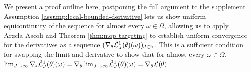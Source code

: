 \documentclass[numsec,webpdf,modern,medium,namedate]{oup-authoring-template}
\newcommand\arxiv[2]{#2} %
\theoremstyle{thmstyleone}%
\theoremstyle{thmstyletwo}%
\theoremstyle{thmstylethree}%
\begin{document}
We present a proof outline here, postponing the full argument to \arxiv{Appendix~\ref{appendix:consistency}}{the supplement}
Assumption \ref{assump:local-bounded-derivative} lets us show uniform equicontinuity of the sequence for almost every $\omega \in \Omega$, allowing us to apply Arzela-Ascoli and Theorem \ref{thm:mop-targeting} to establish uniform convergence for the derivatives as a sequence $(\nabla_\theta \hat{\mathcal{L}}_J^1(\theta)(\omega))_{J \in \mathbb{N}}$. This is a sufficient condition for swapping the limit and derivative to show that for almost every $\omega \in \Omega$, $\lim_{J \to \infty} \nabla_\theta \hat{\mathcal{L}}_J^1(\theta)(\omega) = \nabla_\theta \lim_{J \to \infty} \hat{\mathcal{L}}_J^1(\theta)(\omega) = \nabla_\theta \mathcal{L}(\theta).$


    
\end{document}
